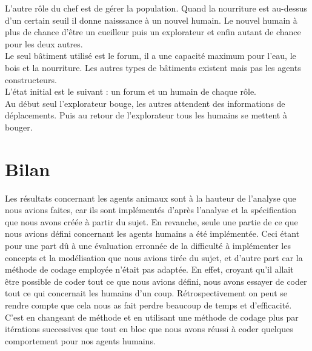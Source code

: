 \documentclass[12pt]{article}
\begin{document}
L'autre rôle du chef est de gérer la population. Quand la nourriture est 
au-dessus d'un certain seuil il donne naisssance à un nouvel humain. Le nouvel 
humain à plus de chance d'être un cueilleur puis un explorateur et enfin autant 
de chance pour les deux autres.\\

Le seul bâtiment utilisé est le forum, il a une capacité maximum pour l'eau, 
le bois et la nourriture. Les autres types de bâtiments existent mais pas 
les agents constructeurs.\\

L'état initial est le suivant : un forum et  un humain de chaque rôle.\\

Au début seul l'explorateur bouge, les autres attendent des informations de 
déplacements. Puis au retour de l'explorateur tous les humains se mettent à 
bouger.

\section{Bilan}

Les résultats concernant les agents animaux sont à la hauteur de l'analyse 
que nous avions faites, car ils sont implémentés d'après l'analyse et la 
spécification que nous avons créée à partir du sujet. En revanche, seule une 
partie de ce que nous avions défini concernant les agents humains a été 
implémentée. Ceci étant pour une part dû à une évaluation erronnée de la 
difficulté à implémenter les concepts et la modélisation que nous avions 
tirée du sujet, et d'autre part car la méthode de codage employée n'était pas 
adaptée. En effet, croyant qu'il allait être possible de coder tout ce que nous 
avions défini, nous avons essayer de coder tout ce qui concernait les humains 
d'un coup. Rétrospectivement on peut se rendre compte que cela nous as fait 
perdre beaucoup de temps et d'efficacité. C'est en changeant de méthode et en 
utilisant une méthode de codage plus par itérations successives que tout en 
bloc que nous avons réussi à coder quelques comportement pour nos agents humains.
\end{document}
